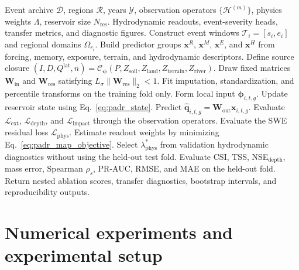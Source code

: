 \documentclass[pdflatex,sn-mathphys-ay]{sn-jnl}
\theoremstyle{thmstyleone}
\begin{document}
\begin{algorithm}[p]
\caption{Partially observed PADR-Net training and transfer validation}
\label{alg:padrnet_training}
\begin{algorithmic}[1]
\Require Event archive $\mathcal{D}$, regions $\mathcal{R}$, years
$\mathcal{Y}$, observation operators $\{\mathcal{H}^{(m)}\}$, physics
weights $\Lambda$, reservoir size $N_{\mathrm{res}}$.
\Ensure Hydrodynamic readouts, event-severity heads, transfer metrics,
and diagnostic figures.
\State Construct event windows $\mathcal{T}_i=[s_i,e_i]$ and regional
domains $\Omega_{r_i}$.
\State Build predictor groups $\mathbf{x}^{R}$, $\mathbf{x}^{M}$,
$\mathbf{x}^{E}$, and $\mathbf{x}^{H}$ from forcing, memory, exposure,
terrain, and hydrodynamic descriptors.
\State Define source closure
$(I,D,Q^{\mathrm{lat}},n)=\mathcal{C}_{\boldsymbol{\psi}}(P,Z_{\mathrm{soil}},Z_{\mathrm{land}},Z_{\mathrm{terrain}},Z_{\mathrm{river}})$.
\State Draw fixed matrices $\mathbf{W}_{\mathrm{in}}$ and
$\mathbf{W}_{\mathrm{res}}$ satisfying
$L_{\sigma}\|\mathbf{W}_{\mathrm{res}}\|_{2}<1$.
  \State Fit imputation, standardization, and percentile transforms on
  the training fold only.
    \State Form local input $\boldsymbol{\phi}_{i,t,g}$.
    \State Update reservoir state using Eq.~\eqref{eq:padr_state}.
  \EndFor
    \State Predict $\hat{\mathbf{q}}_{i,t,g}=\mathbf{W}_{\mathrm{out}}\mathbf{x}_{i,t,g}$.
    \State Evaluate $\mathcal{L}_{\mathrm{ext}}$, $\mathcal{L}_{\mathrm{depth}}$, and
    $\mathcal{L}_{\mathrm{impact}}$ through the observation operators.
    \State Evaluate the SWE residual loss $\mathcal{L}_{\mathrm{phys}}$.
    \State Estimate readout weights by minimizing Eq.~\eqref{eq:padr_map_objective}.
  \EndFor
  \State Select $\lambda_{\mathrm{phys}}^{*}$ from validation
  hydrodynamic diagnostics without using the held-out test fold.
  \State Evaluate CSI, TSS, NSE$_{\mathrm{depth}}$, mass error,
  Spearman $\rho_s$, PR-AUC, RMSE, and MAE on the held-out fold.
\EndFor
\State Return nested ablation scores, transfer diagnostics, bootstrap
intervals, and reproducibility outputs.
\end{algorithmic}
\end{algorithm}


\section{Numerical experiments and experimental setup}
\label{sec:numerical_experiments}
\end{document}
